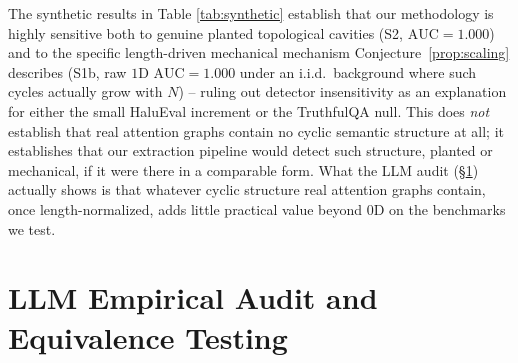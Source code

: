 \documentclass{article}
\begin{document}
The synthetic results in Table \ref{tab:synthetic} establish that our methodology is highly sensitive both to genuine planted topological cavities (S2, $\text{AUC}=1.000$) and to the specific length-driven mechanical mechanism Conjecture~\ref{prop:scaling} describes (S1b, raw $1$D $\text{AUC}=1.000$ under an i.i.d.\ background where such cycles actually grow with $N$) -- ruling out detector insensitivity as an explanation for either the small HaluEval increment or the TruthfulQA null. This does \emph{not} establish that real attention graphs contain no cyclic semantic structure at all; it establishes that our extraction pipeline would detect such structure, planted or mechanical, if it were there in a comparable form. What the LLM audit (\S\ref{sec:audit}) actually shows is that whatever cyclic structure real attention graphs contain, once length-normalized, adds little practical value beyond $0$D on the benchmarks we test.

\section{LLM Empirical Audit and Equivalence Testing}
\label{sec:audit}
\end{document}
